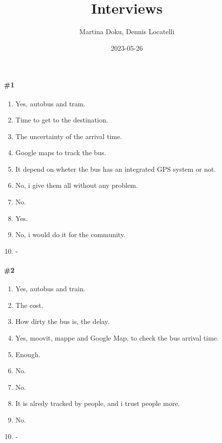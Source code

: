 \documentclass[a4paper, 10pt]{article}
\title{Interviews}
\author{Martina Doku, Dennis Locatelli}
\date{2023-05-26}
\begin{document}
\maketitle
\paragraph*{\#1}
\begin{enumerate}
    \item Yes, autobus and tram.
    \item Time to get to the destination.
    \item The uncertainty of the arrival time.
    \item Google maps to track the bus.
    \item It depend on wheter the bus has an integrated GPS system or not.
    \item No, i give them all without any problem.
    \item No.
    \item Yes.
    \item No, i would do it for the community.
    \item -
\end{enumerate}

\paragraph*{\#2}
\begin{enumerate}
    \item Yes, autobus and train.
    \item The cost.
    \item How dirty the bus is, the delay.
    \item Yes, moovit, mappe and Google Map, to check the bus arrival time.
    \item Enough.
    \item No.
    \item No.
    \item It is alredy tracked by people, and i trust people more.
    \item No.
    \item -
\end{enumerate}
\end{document}
